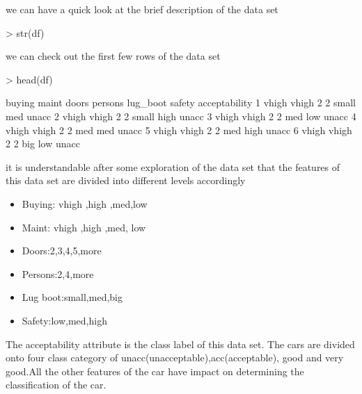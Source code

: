 \documentclass{article}
\begin{document}
we can have a quick look at the brief description of the data set
\begin{Schunk}
\begin{Sinput}
> str(df)
\end{Sinput}
\end{Schunk}
we can check out the first few rows of the data set
\begin{Schunk}
\begin{Sinput}
> head(df)
\end{Sinput}
\begin{Soutput}
  buying maint doors persons lug_boot safety acceptability
1  vhigh vhigh     2       2    small    med         unacc
2  vhigh vhigh     2       2    small   high         unacc
3  vhigh vhigh     2       2      med    low         unacc
4  vhigh vhigh     2       2      med    med         unacc
5  vhigh vhigh     2       2      med   high         unacc
6  vhigh vhigh     2       2      big    low         unacc
\end{Soutput}
\end{Schunk}
it is understandable after some exploration of the data set that the features of this data set are divided into different levels accordingly
\begin{itemize}
  \item Buying: vhigh ,high ,med,low
  \item Maint: vhigh ,high ,med, low
  \item Doors:2,3,4,5,more
  \item Persons:2,4,more
  \item Lug boot:small,med,big
  \item Safety:low,med,high
\end{itemize}
The acceptability attribute is the class label of this data set. The cars are divided onto four class category of unacc(unacceptable),acc(acceptable), good and very good.All the other features of the car have impact on determining the classification of the car.
\end{document}
